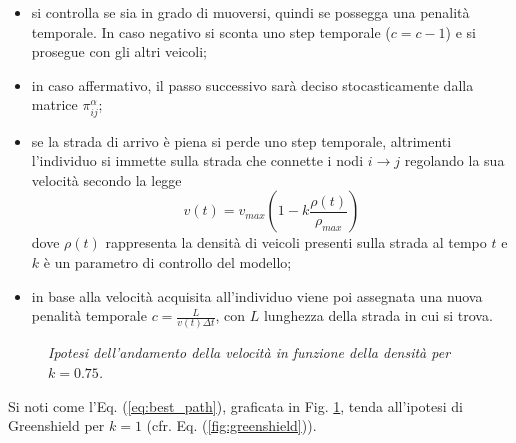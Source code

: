 \begin{itemize}
    \item si controlla se sia in grado di muoversi, quindi se possegga una penalit\`a temporale. In caso negativo si sconta uno step temporale ($c = c -1$) e si prosegue con gli altri veicoli;
    \item in caso affermativo, il passo successivo sarà deciso stocasticamente dalla matrice $\pi_{ij}^{\alpha}$;
    \item se la strada di arrivo \`e piena si perde uno step temporale, altrimenti l'individuo si immette sulla strada che connette i nodi $i \to j$ regolando la sua velocit\`a secondo la legge 
    \begin{equation}
        v(t) = v_{max}\left(1-k\frac{\rho(t)}{\rho_{max}}\right)
        \label{eq:velocity}
    \end{equation}
    dove $\rho(t)$ rappresenta la densit\`a di veicoli presenti sulla strada al tempo $t$ e $k$ \`e un parametro di controllo del modello;
    \item in base alla velocit\`a acquisita all'individuo viene poi assegnata una nuova penalit\`a temporale $c = \frac{L}{v(t)\Delta t}$, con $L$ lunghezza della strada in cui si trova.
\end{itemize}
\begin{figure}[H]
    \centering
    \caption[Velocit\`a nel modello]{\emph{Ipotesi dell'andamento della velocit\`a in funzione della densit\`a per $k = 0.75$.}}
    \label{fig:velocity}
\end{figure}
Si noti come l'Eq. (\ref{eq:best_path}), graficata in Fig. \ref{fig:velocity}, tenda all'ipotesi di Greenshield per $k = 1$ (cfr. Eq. (\ref{fig:greenshield})).

